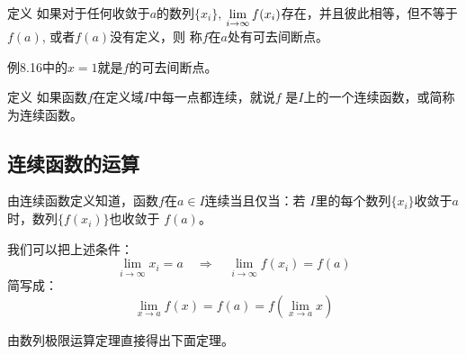 \begin{blk}{定义}
     如果对于任何收敛于$a$的数列$\{x_i\}$, $\displaystyle\lim_{i\to\infty}f(x_i)$存在，并且彼此相等，但不等于$f(a)$, 或者$f(a)$没有定义，则
称$f$在$a$处有可去间断点。
\end{blk}

例8.16中的$x=1$就是$f$的可去间断点。

\begin{blk}{定义}
    如果函数$f$在定义域$I$中每一点都连续，就说$f$
是$I$上的一个连续函数，或简称为连续函数。
\end{blk}

\subsection{连续函数的运算}
由连续函数定义知道，函数$f$在$a\in I$连续当且仅当：若
$I$里的每个数列$\{x_i\}$收敛于$a$时，数列$\{f(x_i)\}$也收敛于
$f(a)$。

我们可以把上述条件：
\[\lim_{i\to \infty}x_i=a \quad \Longrightarrow\quad \lim_{i\to \infty}f(x_i)=f(a)\]
简写成：
\[\lim_{x\to a}f(x)=f(a)=f\left(\lim_{x\to a}x\right)\]

由数列极限运算定理直接得出下面定理。


















\begin{example}
    
\end{example}

\begin{solution}
    
\end{solution}


\begin{example}
    
\end{example}

\begin{solution}
    
\end{solution}

\begin{example}
    
\end{example}

\begin{solution}
    
\end{solution}


